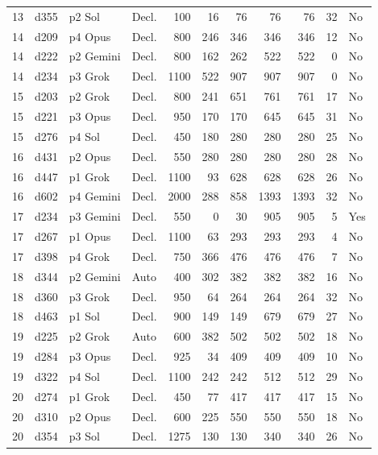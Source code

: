 \begin{longtable}{r l l l r r r r r r l}
13 & d355 & p2 Sol & Decl. & 100 & 16 & 76 & 76 & 76 & 32 & No \\
14 & d209 & p4 Opus & Decl. & 800 & 246 & 346 & 346 & 346 & 12 & No \\
14 & d222 & p2 Gemini & Decl. & 800 & 162 & 262 & 522 & 522 & 0 & No \\
14 & d234 & p3 Grok & Decl. & 1100 & 522 & 907 & 907 & 907 & 0 & No \\
15 & d203 & p2 Grok & Decl. & 800 & 241 & 651 & 761 & 761 & 17 & No \\
15 & d221 & p3 Opus & Decl. & 950 & 170 & 170 & 645 & 645 & 31 & No \\
15 & d276 & p4 Sol & Decl. & 450 & 180 & 280 & 280 & 280 & 25 & No \\
16 & d431 & p2 Opus & Decl. & 550 & 280 & 280 & 280 & 280 & 28 & No \\
16 & d447 & p1 Grok & Decl. & 1100 & 93 & 628 & 628 & 628 & 26 & No \\
16 & d602 & p4 Gemini & Decl. & 2000 & 288 & 858 & 1393 & 1393 & 32 & No \\
17 & d234 & p3 Gemini & Decl. & 550 & 0 & 30 & 905 & 905 & 5 & Yes \\
17 & d267 & p1 Opus & Decl. & 1100 & 63 & 293 & 293 & 293 & 4 & No \\
17 & d398 & p4 Grok & Decl. & 750 & 366 & 476 & 476 & 476 & 7 & No \\
18 & d344 & p2 Gemini & Auto & 400 & 302 & 382 & 382 & 382 & 16 & No \\
18 & d360 & p3 Grok & Decl. & 950 & 64 & 264 & 264 & 264 & 32 & No \\
18 & d463 & p1 Sol & Decl. & 900 & 149 & 149 & 679 & 679 & 27 & No \\
19 & d225 & p2 Grok & Auto & 600 & 382 & 502 & 502 & 502 & 18 & No \\
19 & d284 & p3 Opus & Decl. & 925 & 34 & 409 & 409 & 409 & 10 & No \\
19 & d322 & p4 Sol & Decl. & 1100 & 242 & 242 & 512 & 512 & 29 & No \\
20 & d274 & p1 Grok & Decl. & 450 & 77 & 417 & 417 & 417 & 15 & No \\
20 & d310 & p2 Opus & Decl. & 600 & 225 & 550 & 550 & 550 & 18 & No \\
20 & d354 & p3 Sol & Decl. & 1275 & 130 & 130 & 340 & 340 & 26 & No \\
\end{longtable}
\endgroup
{}
